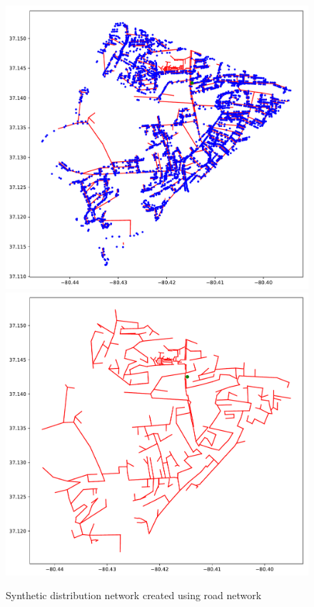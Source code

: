 \documentclass[12pt]{amsart}
\theoremstyle{definition}
\theoremstyle{remark} \newtheorem{remark}[theorem]{Remark} %
\numberwithin{equation}{section} %
\begin{document}
	\begin{figure}
		\centering
		\includegraphics[scale=0.35]{figs/fig2a.pdf}
		\includegraphics[scale=0.35]{figs/fig2b.pdf}
		\caption{Synthetic distribution network created using road network}
		\label{fig:2}
	\end{figure}
	
\end{document}

